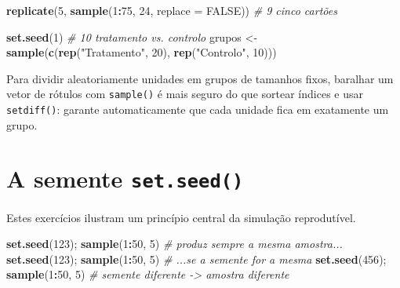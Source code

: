\documentclass[
  portuguese,
  11pt,
  openany]{book}
\newenvironment{Shaded}{\begin{snugshade}}{\end{snugshade}}
\newcommand{\AttributeTok}[1]{\textcolor[rgb]{0.13,0.29,0.53}{#1}}
\newcommand{\CommentTok}[1]{\textcolor[rgb]{0.56,0.35,0.01}{\textit{#1}}}
\newcommand{\ConstantTok}[1]{\textcolor[rgb]{0.56,0.35,0.01}{#1}}
\newcommand{\DecValTok}[1]{\textcolor[rgb]{0.00,0.00,0.81}{#1}}
\newcommand{\FunctionTok}[1]{\textcolor[rgb]{0.13,0.29,0.53}{\textbf{#1}}}
\newcommand{\NormalTok}[1]{#1}
\newcommand{\OtherTok}[1]{\textcolor[rgb]{0.56,0.35,0.01}{#1}}
\newcommand{\SpecialCharTok}[1]{\textcolor[rgb]{0.81,0.36,0.00}{\textbf{#1}}}
\newcommand{\StringTok}[1]{\textcolor[rgb]{0.31,0.60,0.02}{#1}}
\begin{document}
\begin{Shaded}
\begin{Highlighting}[]
\FunctionTok{replicate}\NormalTok{(}\DecValTok{5}\NormalTok{, }\FunctionTok{sample}\NormalTok{(}\DecValTok{1}\SpecialCharTok{:}\DecValTok{75}\NormalTok{, }\DecValTok{24}\NormalTok{, }\AttributeTok{replace =} \ConstantTok{FALSE}\NormalTok{))   }\CommentTok{\# 9 cinco cartões}

\FunctionTok{set.seed}\NormalTok{(}\DecValTok{1}\NormalTok{)                                        }\CommentTok{\# 10 tratamento vs. controlo}
\NormalTok{grupos }\OtherTok{\textless{}{-}} \FunctionTok{sample}\NormalTok{(}\FunctionTok{c}\NormalTok{(}\FunctionTok{rep}\NormalTok{(}\StringTok{"Tratamento"}\NormalTok{, }\DecValTok{20}\NormalTok{), }\FunctionTok{rep}\NormalTok{(}\StringTok{"Controlo"}\NormalTok{, }\DecValTok{10}\NormalTok{)))}
\end{Highlighting}
\end{Shaded}

Para dividir aleatoriamente unidades em grupos de tamanhos fixos, baralhar um
vetor de rótulos com \texttt{sample()} é mais seguro do que sortear índices e usar
\texttt{setdiff()}: garante automaticamente que cada unidade fica em exatamente um
grupo.

\section{\texorpdfstring{A semente \texttt{set.seed()}}{A semente set.seed()}}\label{a-semente-set.seed}

Estes exercícios ilustram um princípio central da simulação reprodutível.

\begin{Shaded}
\begin{Highlighting}[]
\FunctionTok{set.seed}\NormalTok{(}\DecValTok{123}\NormalTok{); }\FunctionTok{sample}\NormalTok{(}\DecValTok{1}\SpecialCharTok{:}\DecValTok{50}\NormalTok{, }\DecValTok{5}\NormalTok{)   }\CommentTok{\# produz sempre a mesma amostra...}
\FunctionTok{set.seed}\NormalTok{(}\DecValTok{123}\NormalTok{); }\FunctionTok{sample}\NormalTok{(}\DecValTok{1}\SpecialCharTok{:}\DecValTok{50}\NormalTok{, }\DecValTok{5}\NormalTok{)   }\CommentTok{\# ...se a semente for a mesma}
\FunctionTok{set.seed}\NormalTok{(}\DecValTok{456}\NormalTok{); }\FunctionTok{sample}\NormalTok{(}\DecValTok{1}\SpecialCharTok{:}\DecValTok{50}\NormalTok{, }\DecValTok{5}\NormalTok{)   }\CommentTok{\# semente diferente {-}\textgreater{} amostra diferente}
\end{Highlighting}
\end{Shaded}
\end{document}
